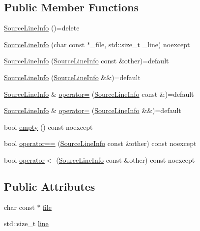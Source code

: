 \subsection*{Public Member Functions}
\begin{DoxyCompactItemize}
\item 
\hyperlink{struct_catch_1_1_source_line_info_a2d80932bb4129b1606d1924a5c44be2f}{Source\-Line\-Info} ()=delete
\item 
\hyperlink{struct_catch_1_1_source_line_info_a48510b82a39a042ab370ed143dd30c10}{Source\-Line\-Info} (char const $\ast$\-\_\-file, std\-::size\-\_\-t \-\_\-line) noexcept
\item 
\hyperlink{struct_catch_1_1_source_line_info_a7c44c9986c33a9cf842b791374332d41}{Source\-Line\-Info} (\hyperlink{struct_catch_1_1_source_line_info}{Source\-Line\-Info} const \&other)=default
\item 
\hyperlink{struct_catch_1_1_source_line_info_a6614b503b493bbdd3b49a1bd732e0a55}{Source\-Line\-Info} (\hyperlink{struct_catch_1_1_source_line_info}{Source\-Line\-Info} \&\&)=default
\item 
\hyperlink{struct_catch_1_1_source_line_info}{Source\-Line\-Info} \& \hyperlink{struct_catch_1_1_source_line_info_a1a6cfc0197357ef4e329bb256aa8a354}{operator=} (\hyperlink{struct_catch_1_1_source_line_info}{Source\-Line\-Info} const \&)=default
\item 
\hyperlink{struct_catch_1_1_source_line_info}{Source\-Line\-Info} \& \hyperlink{struct_catch_1_1_source_line_info_a7fa35372f2bca5e91adc25327b7c753c}{operator=} (\hyperlink{struct_catch_1_1_source_line_info}{Source\-Line\-Info} \&\&)=default
\item 
bool \hyperlink{struct_catch_1_1_source_line_info_a10a5b5b7dff82971879c2eb8d83f9b3b}{empty} () const noexcept
\item 
bool \hyperlink{struct_catch_1_1_source_line_info_af07e4fdeddf8409b91e4f842f6264cf8}{operator==} (\hyperlink{struct_catch_1_1_source_line_info}{Source\-Line\-Info} const \&other) const noexcept
\item 
bool \hyperlink{struct_catch_1_1_source_line_info_af77415416919d2d6030b4be085b92f7a}{operator$<$} (\hyperlink{struct_catch_1_1_source_line_info}{Source\-Line\-Info} const \&other) const noexcept
\end{DoxyCompactItemize}
\subsection*{Public Attributes}
\begin{DoxyCompactItemize}
\item 
char const $\ast$ \hyperlink{struct_catch_1_1_source_line_info_ad65537703e9f08c1fa7777fbc3f0c617}{file}
\item 
std\-::size\-\_\-t \hyperlink{struct_catch_1_1_source_line_info_a841e5d696c7b9cde24e45e61dd979c77}{line}
\end{DoxyCompactItemize}


